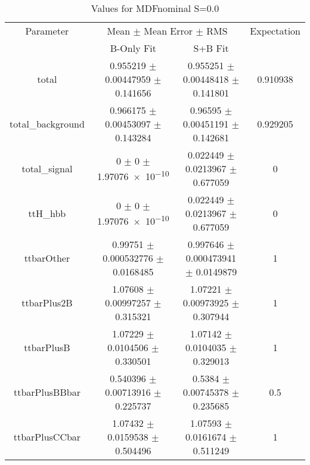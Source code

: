\begin{table}
\centering
\caption{Values for MDFnominal S=0.0}
\begin{tabular}{cccc}
\toprule
Parameter & \multicolumn{2}{c}{Mean $\pm$ Mean Error $\pm$ RMS} & Expectation\\
 & B-Only Fit & S+B Fit & \\
\midrule
total & \num{0.955219} $\pm$ \num{0.00447959} $\pm$ \num{0.141656} & \num{0.955251} $\pm$ \num{0.00448418} $\pm$ \num{0.141801} & \num{0.910938}\\
total\_background & \num{0.966175} $\pm$ \num{0.00453097} $\pm$ \num{0.143284} & \num{0.96595} $\pm$ \num{0.00451191} $\pm$ \num{0.142681} & \num{0.929205}\\
total\_signal & \num{0} $\pm$ \num{0} $\pm$ \num{1.97076e-10} & \num{0.022449} $\pm$ \num{0.0213967} $\pm$ \num{0.677059} & \num{0}\\
ttH\_hbb & \num{0} $\pm$ \num{0} $\pm$ \num{1.97076e-10} & \num{0.022449} $\pm$ \num{0.0213967} $\pm$ \num{0.677059} & \num{0}\\
ttbarOther & \num{0.99751} $\pm$ \num{0.000532776} $\pm$ \num{0.0168485} & \num{0.997646} $\pm$ \num{0.000473941} $\pm$ \num{0.0149879} & \num{1}\\
ttbarPlus2B & \num{1.07608} $\pm$ \num{0.00997257} $\pm$ \num{0.315321} & \num{1.07221} $\pm$ \num{0.00973925} $\pm$ \num{0.307944} & \num{1}\\
ttbarPlusB & \num{1.07229} $\pm$ \num{0.0104506} $\pm$ \num{0.330501} & \num{1.07142} $\pm$ \num{0.0104035} $\pm$ \num{0.329013} & \num{1}\\
ttbarPlusBBbar & \num{0.540396} $\pm$ \num{0.00713916} $\pm$ \num{0.225737} & \num{0.5384} $\pm$ \num{0.00745378} $\pm$ \num{0.235685} & \num{0.5}\\
ttbarPlusCCbar & \num{1.07432} $\pm$ \num{0.0159538} $\pm$ \num{0.504496} & \num{1.07593} $\pm$ \num{0.0161674} $\pm$ \num{0.511249} & \num{1}\\
\bottomrule
\end{tabular}
\end{table}